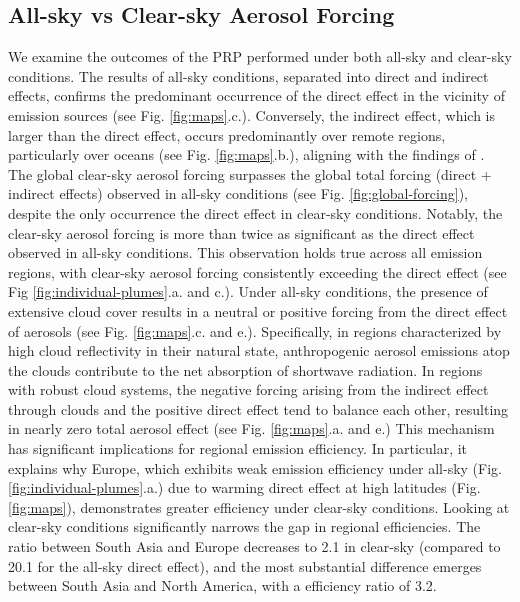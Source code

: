 \documentclass[draft]{agujournal2019}
\begin{document}
      \subsection{All-sky vs Clear-sky Aerosol Forcing}
            We examine the outcomes of the PRP performed under both all-sky and clear-sky conditions. The results of all-sky conditions, separated into direct and indirect effects, confirms the predominant occurrence of the direct effect in the vicinity of emission sources (see Fig. \ref{fig:maps}.c.). Conversely, the indirect effect, which is larger than the direct effect, occurs predominantly over remote regions, particularly over oceans (see Fig. \ref{fig:maps}.b.), aligning with the findings of .
            The global clear-sky aerosol forcing surpasses the global total forcing (direct + indirect effects) observed in all-sky conditions (see Fig. \ref{fig:global-forcing}), despite the only occurrence the direct effect in clear-sky conditions. Notably, the clear-sky aerosol forcing is more than twice as significant as the direct effect observed in all-sky conditions. This observation holds true across all emission regions, with clear-sky aerosol forcing consistently exceeding the direct effect (see Fig \ref{fig:individual-plumes}.a. and c.). 
            Under all-sky conditions, the presence of extensive cloud cover results in a neutral or positive forcing from the direct effect of aerosols (see Fig. \ref{fig:maps}.c. and e.). Specifically, in regions characterized by high cloud reflectivity in their natural state, anthropogenic aerosol emissions atop the clouds contribute to the net absorption of shortwave radiation. In regions with robust cloud systems, the negative forcing arising from the indirect effect through clouds and the positive direct effect tend to balance each other, resulting in nearly zero total aerosol effect (see Fig. \ref{fig:maps}.a. and e.)
            This mechanism has significant implications for regional emission efficiency. In particular, it explains why Europe, which exhibits weak emission efficiency under all-sky (Fig. \ref{fig:individual-plumes}.a.) due to warming direct effect at high latitudes (Fig. \ref{fig:maps}), demonstrates greater efficiency under clear-sky conditions. Looking at clear-sky conditions significantly narrows the gap in regional efficiencies. The ratio between South Asia and Europe decreases to 2.1 in clear-sky (compared to 20.1 for the all-sky direct effect), and the most substantial difference emerges between South Asia and North America, with a efficiency ratio of 3.2.
\end{document}
